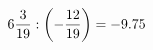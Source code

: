 \documentclass[preview]{standalone}
\begin{document}
\begin{align*}
6 { 3 \over 19 }  :  \left( - { 12 \over 19 } \right) = -9.75
\end{align*}
\end{document}
